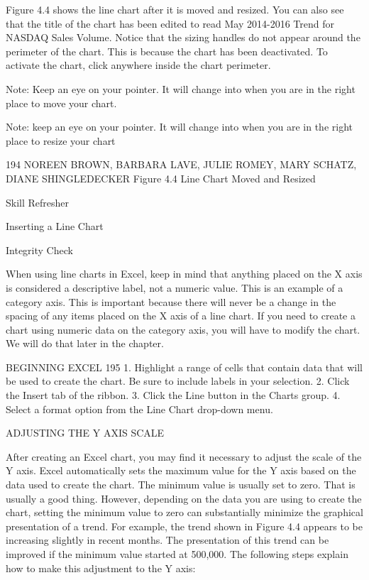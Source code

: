 Figure 4.4 shows the line chart after it is moved and resized. You can also see that the title of the
chart has been edited to read May 2014-2016 Trend for NASDAQ Sales Volume. Notice that the
sizing handles do not appear around the perimeter of the chart. This is because the chart has been
deactivated. To activate the chart, click anywhere inside the chart perimeter.




Note: Keep an eye on your pointer. It will change into   when you are in the right place to move your
chart.




Note: keep an eye on your pointer. It will change into   when you are in the right place to resize your
chart




194 NOREEN BROWN, BARBARA LAVE, JULIE ROMEY, MARY SCHATZ, DIANE SHINGLEDECKER
Figure 4.4 Line Chart Moved and Resized




Skill Refresher


Inserting a Line Chart




Integrity Check

When using line charts in Excel, keep in mind that anything placed on the X axis is considered a descriptive label,
not a numeric value. This is an example of a category axis. This is important because there will never be a change in
the spacing of any items placed on the X axis of a line chart. If you need to create a chart using numeric data on the
category axis, you will have to modify the chart. We will do that later in the chapter.




BEGINNING EXCEL 195
1. Highlight a range of cells that contain data that will be used to create the chart. Be sure to include labels
in your selection.
2. Click the Insert tab of the ribbon.
3. Click the Line button in the Charts group.
4. Select a format option from the Line Chart drop-down menu.



ADJUSTING THE Y AXIS SCALE

After creating an Excel chart, you may find it necessary to adjust the scale of the Y axis. Excel
automatically sets the maximum value for the Y axis based on the data used to create the chart. The
minimum value is usually set to zero. That is usually a good thing. However, depending on the data
you are using to create the chart, setting the minimum value to zero can substantially minimize the
graphical presentation of a trend. For example, the trend shown in Figure 4.4 appears to be increasing
slightly in recent months. The presentation of this trend can be improved if the minimum value
started at 500,000. The following steps explain how to make this adjustment to the Y axis:


